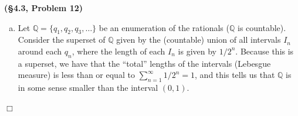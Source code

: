 \documentclass[12pt]{article}
\theoremstyle{definition}
\newenvironment{Solution}{\noindent {\sc Solution.}}{$\Box$ \vspace{2 ex}}
\begin{document}
\vspace{0.5cm}

\begin{Solution}
{\bf (\S4.3, Problem 12)}\\
    
\begin{enumerate}[(a)]
\item Let $\mathbb Q = \{ q_1,q_2,q_3, \dots\}$ be an enumeration of the rationals ($\mathbb Q$ is countable). Consider the superset of $\mathbb Q$ given by the (countable) union of all intervals $I_n$ around each $q_n$, where the length of each $I_n$ is given by $1/2^n$. Because this is a superset, we have that the ``total'' lengths of the intervals (Lebesgue measure) is less than or equal to $\sum_{n=1}^\infty 1/2^n = 1$, and this tells us that $\mathbb Q$ is in some sense smaller than the interval $(0, 1)$.

\end{enumerate}
\end{Solution}
\end{document}
